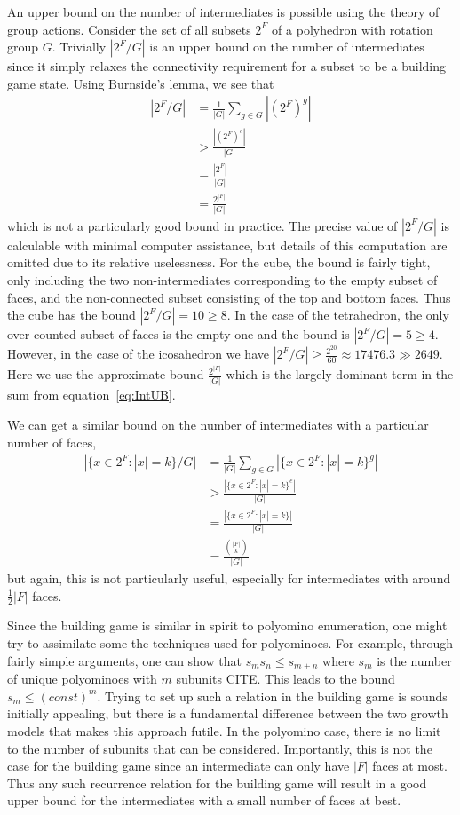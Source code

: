 An upper bound on the number of intermediates is possible using the theory of group actions. Consider the set of all subsets $2^F$ of a polyhedron with rotation group $G$. Trivially $|2^F/G|$ is an upper bound on the number of intermediates since it simply relaxes the connectivity requirement for a subset to be a building game state. Using Burnside's lemma, we see that 
\begin{align}
  \label{eq:IntUB}
  |2^F/G| &= \frac{1}{|G|}\sum_{g \in G}|(2^F)^g| \\
  &> \frac{|(2^F)^e|}{|G|} \\
  &= \frac{|2^F|}{|G|} \\
  &= \frac{2^{|F|}}{|G|}
\end{align}
which is not a particularly good bound in practice. The precise value of $|2^F/G|$ is calculable with minimal computer assistance, but details of this computation are omitted due to its relative uselessness. For the cube, the bound is fairly tight, only including the two non-intermediates corresponding to the empty subset of faces, and the non-connected subset consisting of the top and bottom faces. Thus the cube has the bound $|2^F/G| = 10 \geq 8$. In the case of the tetrahedron, the only over-counted subset of faces is the empty one and the bound is $|2^F/G| = 5 \geq 4$. However, in the case of the icosahedron we have $|2^F/G| \geq \frac{2^{20}}{60} \approx 17476.3 \gg 2649$. Here we use the approximate bound $\frac{2^{|F|}}{|G|}$ which is the largely dominant term in the sum from equation~\ref{eq:IntUB}.

We can get a similar bound on the number of intermediates with a particular number of faces,
\begin{align}
  |\{x \in 2^F: |x| = k\} /G| &= \frac{1}{|G|}\sum_{g \in G}|\{x \in 2^F: |x| = k\}^g| \\
  &> \frac{|\{x \in 2^F: |x| = k\}^e|}{|G|} \\
  &= \frac{|\{x \in 2^F: |x| = k\}|}{|G|} \\
  &= \frac{{|F| \choose k}}{|G|}
\end{align}
but again, this is not particularly useful, especially for intermediates with around $\frac{1}{2}|F|$ faces.

Since the building game is similar in spirit to polyomino enumeration, one might try to assimilate some the techniques used for polyominoes. For example, through fairly simple arguments, one can show that $s_ms_n \leq s_{m+n}$ where $s_m$ is the number of unique polyominoes with $m$ subunits CITE. This leads to the bound $s_m \leq (const)^m$. Trying to set up such a relation in the building game is sounds initially appealing, but there is a fundamental difference between the two growth models that makes this approach futile. In the polyomino case, there is no limit to the number of subunits that can be considered. Importantly, this is not the case for the building game since an intermediate can only have $|F|$ faces at most. Thus any such recurrence relation for the building game will result in a good upper bound for the intermediates with a small number of faces at best.

